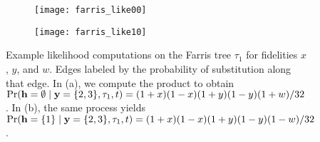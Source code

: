 \begin{figure}
\centering
\begin{subfigure}{.45\linewidth}
\centering
\texttt{[image: farris\_like00]}
\caption[short]{}
\end{subfigure}
\begin{subfigure}{.45\linewidth}
\centering
\texttt{[image: farris\_like10]}
\caption[short]{}
\end{subfigure}
\caption{
    Example likelihood computations on the Farris tree $\tau_1$ for fidelities $x$, $y$, and $w$.
    Edges labeled by the probability of substitution along that edge.
    In (a), we compute the product to obtain $\Pr(\mathbf{h}=\emptyset\mid \mathbf{y}=\{2,3\},\tau_1,t) = (1+x)(1-x)(1+y)(1-y)(1+w)/32$.
    In (b), the same process yields $\Pr(\mathbf{h}=\{1\}\mid \mathbf{y}=\{2,3\},\tau_1,t) = (1+x)(1-x)(1+y)(1-y)(1-w)/32$.
}
\label{fig:example_likelihoods}
\end{figure}

